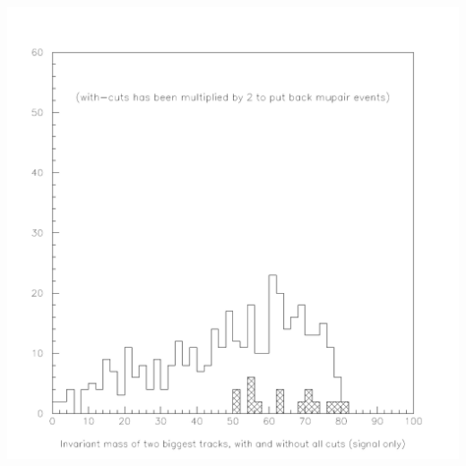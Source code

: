 \documentclass[landscape]{article}
\begin{document}
\begin{center} \includegraphics[height=0.8\textheight]{two_hours_7.pdf} \end{center}
\pagebreak
\end{document}
